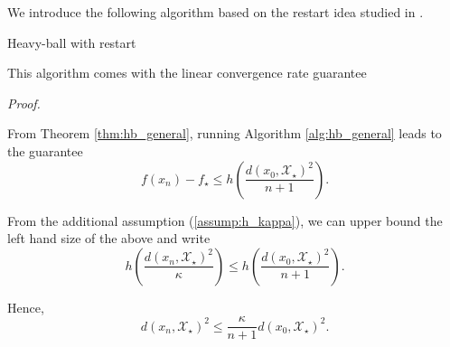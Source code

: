We introduce the following algorithm based on the restart idea studied in \citep{nemirovskii1985optimal, nesterov2013gradient, iouditski2014primal}.

\begin{algorithm}
\caption{Heavy-ball with restart}
\label{alg:hb_restart}
\end{algorithm}

This algorithm comes with the linear convergence rate guarantee

\begin{center}
\end{center}

\noindent \textit{Proof.}
    
    From Theorem \ref{thm:hb_general}, running Algorithm \ref{alg:hb_general} leads to the guarantee
    \begin{equation}
        f(x_n) - f_\star \leq h\left(\frac{d\left(x_0, \mathcal{X}_\star\right)^2}{n+1} \right).
    \end{equation}
    
    From the additional assumption (\ref{assump:h_kappa}), we can upper bound the left hand size of the above and write
    \begin{equation*}
        h\left( \frac{ d(x_n, \mathcal{X}_\star)^2}{\kappa} \right) \leq h\left(\frac{d\left(x_0, \mathcal{X}_\star\right)^2}{n+1} \right).
    \end{equation*}
    
    Hence,
    \begin{equation*}
        d(x_n, \mathcal{X}_\star)^2 \leq \frac{\kappa}{n+1}d(x_0, \mathcal{X}_\star)^2.
    \end{equation*}
    
